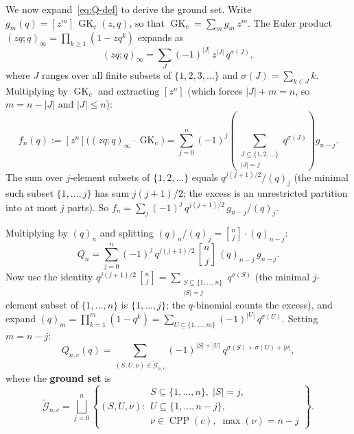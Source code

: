 \documentclass[11pt]{article}
\newcommand{\GK}{\operatorname{GK}}
\newcommand{\CPP}{\operatorname{CPP}}
\newcommand{\qpoch}[2]{(#1;#2)_\infty}
\newcommand{\qbin}[2]{\genfrac{[}{]}{0pt}{}{#1}{#2}}
\theoremstyle{plain}
\theoremstyle{definition}
\begin{document}
\noindent
We now expand~\eqref{eq:Q-def} to derive the ground set.
Write $g_m(q) = [z^m]\,\GK_c(z,q)$, so that
$\GK_c = \sum_m g_m\, z^m$.  The Euler product
$\qpoch{zq}{q} = \prod_{k \geq 1}(1 - zq^k)$ expands as
\[
  \qpoch{zq}{q} = \sum_{J} (-1)^{|J|}\, z^{|J|}\,
    q^{\sigma(J)},
\]
where $J$ ranges over all finite subsets of
$\{1, 2, 3, \ldots\}$ and $\sigma(J) = \sum_{k \in J} k$.
Multiplying by $\GK_c$ and extracting $[z^n]$ (which forces
$|J| + m = n$, so $m = n - |J|$ and $|J| \leq n$):
\[
  f_n(q) := [z^n]\bigl(\qpoch{zq}{q} \cdot \GK_c\bigr)
  = \sum_{j=0}^{n} (-1)^j
    \left(\sum_{\substack{J \subseteq \{1,2,\ldots\}
    \\[2pt] |J| = j}} q^{\sigma(J)}\right)
    g_{n-j}.
\]
The sum over $j$-element subsets of $\{1,2,\ldots\}$
equals $q^{j(j+1)/2}/(q)_j$ (the minimal such subset
$\{1, \ldots, j\}$ has sum $j(j+1)/2$; the excess is an
unrestricted partition into at most $j$ parts).  So
$f_n = \sum_{j} (-1)^j\, q^{j(j+1)/2}\, g_{n-j} / (q)_j$.

Multiplying by $(q)_n$ and splitting $(q)_n/(q)_j
= \qbin{n}{j} \cdot (q)_{n-j}$:
\[
  Q_n = \sum_{j=0}^{n} (-1)^j\, q^{j(j+1)/2}\,
    \qbin{n}{j}\, (q)_{n-j}\, g_{n-j}.
\]
Now use the identity $q^{j(j+1)/2}\,\qbin{n}{j}
= \sum_{\substack{S \subseteq \{1,\ldots,n\} \\
|S|=j}} q^{\sigma(S)}$ (the minimal $j$-element subset of
$\{1, \ldots, n\}$ is $\{1, \ldots, j\}$; the $q$-binomial
counts the excess), and expand
$(q)_m = \prod_{k=1}^{m}(1-q^k)
= \sum_{U \subseteq \{1,\ldots,m\}} (-1)^{|U|}\,q^{\sigma(U)}$.
Setting $m = n - j$:
\begin{equation}\label{eq:Q-triple}
  \boxed{\;
  Q_{n,c}(q)
  = \sum_{(S, U, \nu) \in \widetilde{\mathcal{G}}_{n,c}}
    (-1)^{|S| + |U|}\,
    q^{\sigma(S) + \sigma(U) + |\nu|},
  \;}
\end{equation}
where the \textbf{ground set} is
\begin{equation}\label{eq:ground-set}
  \widetilde{\mathcal{G}}_{n,c}
  = \bigsqcup_{j=0}^{n}
  \left\{(S, U, \nu) :
    \begin{array}{l}
      S \subseteq \{1, \ldots, n\},\; |S| = j, \\[2pt]
      U \subseteq \{1, \ldots, n-j\}, \\[2pt]
      \nu \in \CPP(c),\; \max(\nu) = n - j
    \end{array}
  \right\}.
\end{equation}
\end{document}
